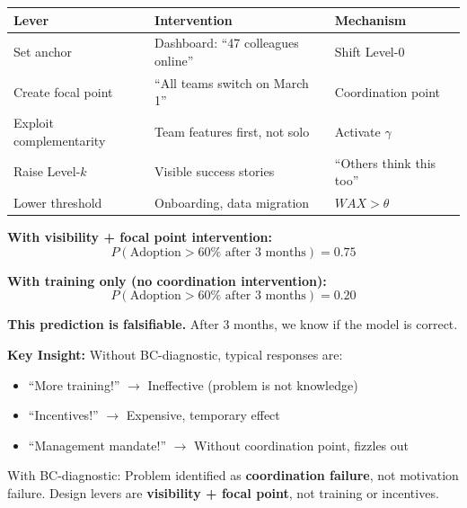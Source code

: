 \begin{tcolorbox}[colback=blue!5!white, colframe=blue!75!black,
    title=\textbf{Step 3: Design Levers from BC Structure}]

\begin{center}
\renewcommand{\arraystretch}{1.2}
\begin{tabular}{@{}p{3.5cm}p{4.5cm}p{4.5cm}@{}}
\toprule
\textbf{Lever} & \textbf{Intervention} & \textbf{Mechanism} \\
\midrule
Set anchor & Dashboard: ``47 colleagues online'' & Shift Level-0 \\
Create focal point & ``All teams switch on March 1'' & Coordination point \\
Exploit complementarity & Team features first, not solo & Activate $\gamma$ \\
Raise Level-$k$ & Visible success stories & ``Others think this too'' \\
Lower threshold & Onboarding, data migration & $WAX > \theta$ \\
\bottomrule
\end{tabular}
\end{center}

\end{tcolorbox}

\begin{tcolorbox}[colback=red!5!white, colframe=red!75!black,
    title=\textbf{Step 4: Testable Prediction}]

\textbf{With visibility + focal point intervention:}
\[
P(\text{Adoption} > 60\% \text{ after 3 months}) = 0.75
\]

\textbf{With training only (no coordination intervention):}
\[
P(\text{Adoption} > 60\% \text{ after 3 months}) = 0.20
\]

\vspace{0.5em}
\textbf{This prediction is falsifiable.} After 3 months, we know if the model is correct.

\vspace{0.5em}
\textbf{Key Insight:} Without BC-diagnostic, typical responses are:
\begin{itemize}[nosep]
    \item ``More training!'' $\rightarrow$ Ineffective (problem is not knowledge)
    \item ``Incentives!'' $\rightarrow$ Expensive, temporary effect
    \item ``Management mandate!'' $\rightarrow$ Without coordination point, fizzles out
\end{itemize}

With BC-diagnostic: Problem identified as \textbf{coordination failure}, not motivation failure.
Design levers are \textbf{visibility + focal point}, not training or incentives.

\end{tcolorbox}

